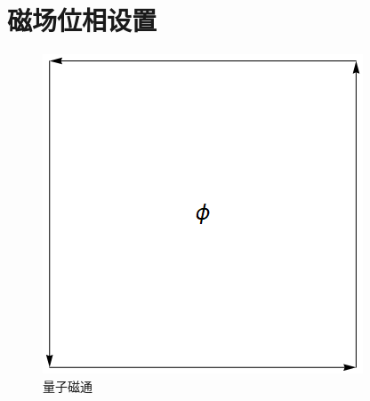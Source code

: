 \documentclass[a4paper,12pt]{ctexart}
\numberwithin{equation}{section}
\begin{document}
\section{磁场位相设置}
\begin{figure}[ht]
\centering
\includegraphics[scale=0.45]{cycle.png}
\caption{量子磁通}\label{magnet}
\end{figure}









\newpage
	
\end{document}
